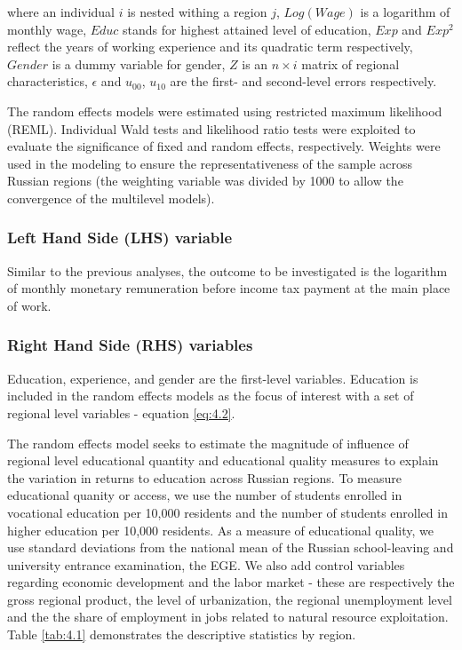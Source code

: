 \documentclass[12pt,a4paper]{article}
\numberwithin{equation}{section}
\begin{document}
\noindent
where an individual $i$ is nested withing a region $j$, $Log(Wage)$ is a logarithm of monthly wage, $Educ$ stands for highest attained level of education, $Exp$ and $Exp^2$ reflect the years of working experience and its quadratic term respectively, $Gender$ is a dummy variable for gender, $Z$ is an $n\times i$ matrix of regional characteristics, $\epsilon$ and $u_{00}$, $u_{10}$ are the first- and second-level errors respectively.

The random effects models were estimated using restricted maximum likelihood (REML). Individual Wald tests and likelihood ratio tests were exploited to evaluate the significance of fixed and random effects, respectively. Weights were used in the modeling to ensure the representativeness of the sample across Russian regions (the weighting variable was divided by 1000 to allow the convergence of the multilevel models). 

\subsubsection{Left Hand Side (LHS) variable}
Similar to the previous analyses, the outcome to be investigated is the logarithm of monthly monetary remuneration before income tax payment at the main place of work.

\subsubsection{Right Hand Side (RHS) variables}
Education, experience, and gender are the first-level  variables. Education is included in the random effects models as the focus of interest with a set of regional level variables - equation \ref{eq:4.2}. 

The random effects model seeks to estimate the magnitude of influence of regional level educational quantity and educational quality measures to explain the variation in returns to education across Russian regions. To measure educational quanity or access, we use the number of students enrolled in vocational education per 10,000 residents and the number of students enrolled in higher education per 10,000 residents. As a measure of educational quality, we use standard deviations from the national mean of the Russian school-leaving and university entrance examination, the EGE. We also add control variables regarding economic development and the labor market - these are respectively the gross regional product, the level of urbanization, the regional unemployment level and the the share of employment in jobs related to natural resource exploitation. Table \ref{tab:4.1} demonstrates the descriptive statistics by region.
\end{document}
